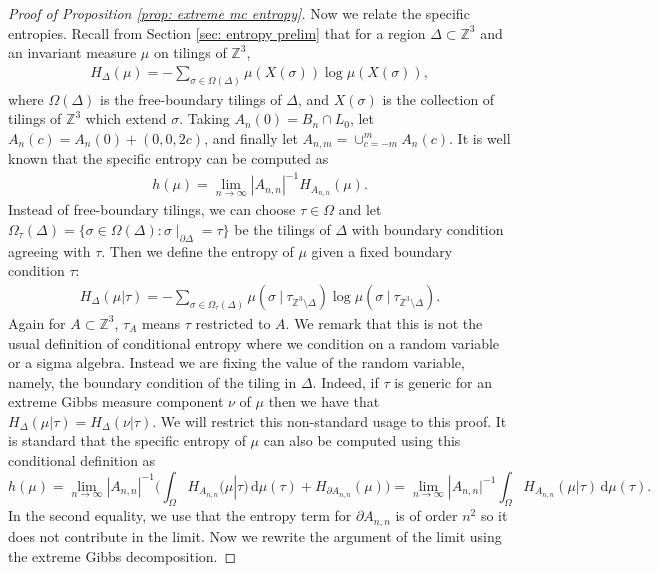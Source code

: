 \documentclass[11pt]{article}
\theoremstyle{remark}
\theoremstyle{definition}
\newcommand{\m}[1]{\mathbb{#1}}
\newcommand{\dd}{\mathrm{d}}
\newcommand{\symindex}[1]{\index{{\textbf{Symbols}}!#1}}
\begin{document}
\begin{proof}[Proof of Proposition \ref{prop: extreme mc entropy}]
Now we relate the specific entropies. Recall from Section \ref{sec: entropy prelim} that for a region $\Delta\subset \m Z^3$ and an invariant measure $\mu$ on tilings of $\m Z^3$,
\begin{align*}
    H_{\Delta}(\mu) = -\sum_{\sigma\in \Omega(\Delta)} \mu(X(\sigma))\log \mu(X(\sigma)),
\end{align*}
where $\Omega(\Delta)$ is the free-boundary tilings of $\Delta$, and $X(\sigma)$ is the collection of tilings of $\m Z^3$ which extend $\sigma$.
Taking $A_n(0) = B_n\cap L_0$, let $A_n(c) = A_n(0) + (0,0,2c)$, and finally let $A_{n,m} = \cup_{c=-m}^m A_n(c)$.\symindex{Chapter 4!$A_n(c),A_{n,n}$}
 It is well known that the specific entropy can be computed as
\begin{align*}
    h(\mu)= \lim_{n\to \infty} |A_{n,n}|^{-1} H_{A_{n,n}}(\mu). 
\end{align*}
Instead of free-boundary tilings, we can choose $\tau\in \Omega$ and let $\Omega_\tau(\Delta)=\{\sigma \in \Omega(\Delta): \sigma\mid_{\partial \Delta} =\tau\}$ be the tilings of $\Delta$ with boundary condition agreeing with $\tau$. Then we define the entropy of $\mu$ given a fixed boundary condition $\tau$:
\begin{align*}
    H_{\Delta}(\mu|\tau) = -\sum_{\sigma \in \Omega_\tau(\Delta)} \mu(\sigma~|~\tau_{\m Z^3\setminus \Delta}) \log \mu(\sigma~|~\tau_{\m Z^3\setminus \Delta}). 
\end{align*}
Again for $A\subset \m Z^3$, $\tau_A$ means $\tau$ restricted to $A$. We remark that this is not the usual definition of conditional entropy where we condition on a random variable or a sigma algebra. Instead we are fixing the value of the random variable, namely, the boundary condition of the tiling in $\Delta$. Indeed, if $\tau$ is generic for an extreme Gibbs measure component $\nu$ of $\mu$ then we have that $H_{\Delta}(\mu|\tau)=H_{\Delta}(\nu|\tau)$. We will restrict this non-standard usage to this proof. It is standard that the specific entropy of $\mu$ can also be computed using this conditional definition as 
\begin{equation}\label{eq: ent boundary fixed}
    h(\mu) = \lim_{n\to \infty} |A_{n,n}|^{-1} (\int_{\Omega} H_{A_{n,n}}(\mu|\tau) \, \dd \mu(\tau) +H_{\partial A_{n,n}}(\mu))= \lim_{n\to \infty} |A_{n,n}|^{-1} \int_{\Omega} H_{A_{n,n}}(\mu|\tau) \, \dd \mu(\tau). 
\end{equation}
In the second equality, we use that the entropy term for $\partial A_{n,n}$ is of order $n^2$ so it does not contribute in the limit. Now we rewrite the argument of the limit using the extreme Gibbs decomposition. 

\end{proof}
\end{document}
